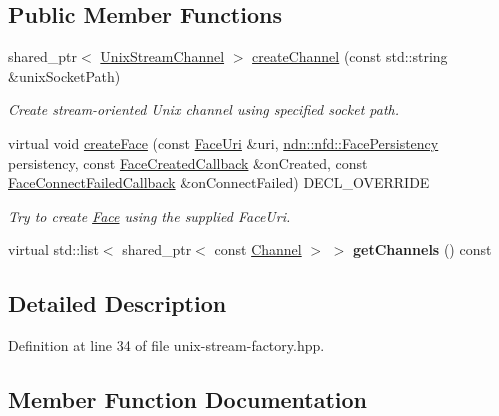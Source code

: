 \subsection*{Public Member Functions}
\begin{DoxyCompactItemize}
\item 
shared\+\_\+ptr$<$ \hyperlink{classnfd_1_1UnixStreamChannel}{Unix\+Stream\+Channel} $>$ \hyperlink{classnfd_1_1UnixStreamFactory_ac54cfd92cffc2664b77e1962c348751a}{create\+Channel} (const std\+::string \&unix\+Socket\+Path)
\begin{DoxyCompactList}\small\item\em Create stream-\/oriented Unix channel using specified socket path. \end{DoxyCompactList}\item 
virtual void \hyperlink{classnfd_1_1UnixStreamFactory_a2f01d594f9aa3da8307e2f1a4f77094f}{create\+Face} (const \hyperlink{classndn_1_1util_1_1FaceUri}{Face\+Uri} \&uri, \hyperlink{group__management_ga05df4b7c484a0fae25d3e65962511bac}{ndn\+::nfd\+::\+Face\+Persistency} persistency, const \hyperlink{namespacenfd_a6d4b91580c829552a452c53458381b0f}{Face\+Created\+Callback} \&on\+Created, const \hyperlink{namespacenfd_ae87d4f07de26f4939691439b51f2dd83}{Face\+Connect\+Failed\+Callback} \&on\+Connect\+Failed) D\+E\+C\+L\+\_\+\+O\+V\+E\+R\+R\+I\+DE
\begin{DoxyCompactList}\small\item\em Try to create \hyperlink{classnfd_1_1Face}{Face} using the supplied Face\+Uri. \end{DoxyCompactList}\item 
virtual std\+::list$<$ shared\+\_\+ptr$<$ const \hyperlink{classnfd_1_1Channel}{Channel} $>$ $>$ {\bfseries get\+Channels} () const\hypertarget{classnfd_1_1UnixStreamFactory_a7b84935f44e357170805ce46f881e091}{}\label{classnfd_1_1UnixStreamFactory_a7b84935f44e357170805ce46f881e091}

\end{DoxyCompactItemize}


\subsection{Detailed Description}


Definition at line 34 of file unix-\/stream-\/factory.\+hpp.



\subsection{Member Function Documentation}
